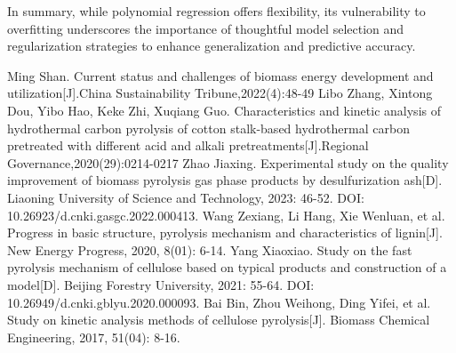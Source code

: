 \documentclass{swmcmthesis}
\begin{document}
In summary, while polynomial regression offers flexibility, its vulnerability to overfitting underscores the importance of thoughtful model selection and regularization strategies to enhance generalization and predictive accuracy.


\begin{thebibliography}{9}%
 Ming Shan. Current status and challenges of biomass energy development and utilization[J].China Sustainability Tribune,2022(4):48-49
 Libo Zhang, Xintong Dou, Yibo Hao, Keke Zhi, Xuqiang Guo. Characteristics and kinetic analysis of hydrothermal carbon pyrolysis of cotton stalk-based hydrothermal carbon pretreated with different acid and alkali pretreatments[J].Regional Governance,2020(29):0214-0217
 Zhao Jiaxing. Experimental study on the quality improvement of biomass pyrolysis gas phase products by desulfurization ash[D]. Liaoning University of Science and Technology, 2023: 46-52. DOI: 10.26923/d.cnki.gasgc.2022.000413.
 Wang Zexiang, Li Hang, Xie Wenluan, et al. Progress in basic structure, pyrolysis mechanism and characteristics of lignin[J]. New Energy Progress, 2020, 8(01): 6-14.
 Yang Xiaoxiao. Study on the fast pyrolysis mechanism of cellulose based on typical products and construction of a model[D]. Beijing Forestry University, 2021: 55-64. DOI: 10.26949/d.cnki.gblyu.2020.000093.
 Bai Bin, Zhou Weihong, Ding Yifei, et al. Study on kinetic analysis methods of cellulose pyrolysis[J]. Biomass Chemical Engineering, 2017, 51(04): 8-16.
\end{thebibliography}




%
\end{document}
